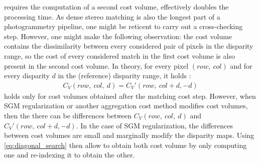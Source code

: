 \begin{remark}
      requires the computation of a second cost volume, effectively doubles the processing time. As dense stereo matching is also the longest part of a photogrammetry pipeline, one might be reticent to carry out a cross-checking step. However, one might make the following observation: the cost volume contains the dissimilarity between every considered pair of pixels in the disparity range, so the cost of every considered match in the first cost volume is also present in the second cost volume. In theory, for every pixel $(row, ~col)$ and for every disparity $d$ in the (reference) disparity range, it holds \cite{bebis_mutual_2008}:
     \begin{align}\label{eq:diagonal_search}
         C_V(row,~col,~d) = C_V'(row,~col+d, -d)
     \end{align}
      holds only for cost volumes obtained after the matching cost step. However, when SGM regularization or another aggregation cost method modifies cost volumes, then the there can be differences between $C_V(row,~col,~d)$ and $C_V'(row,~col+d, -d)$. In the case of SGM regularization, the differences between cost volumes are small and marginally modify the disparity maps. Using \eqref{eq:diagonal_search} then allow to obtain both cost volume by only computing one and re-indexing it to obtain the other. 
\end{remark}

